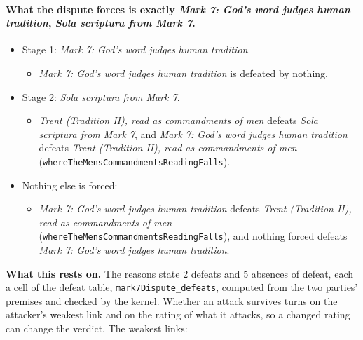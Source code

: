 \documentclass[11pt]{article}
\begin{document}
\paragraph{What the dispute forces is exactly \emph{Mark 7: God’s word judges human tradition}, \emph{Sola scriptura from Mark 7}.}
\begin{itemize}
\item Stage 1: \emph{Mark 7: God’s word judges human tradition}.
\begin{itemize}
\item \emph{Mark 7: God’s word judges human tradition} is defeated by nothing.
\end{itemize}
\item Stage 2: \emph{Sola scriptura from Mark 7}.
\begin{itemize}
\item \emph{Trent (Tradition II), read as commandments of men} defeats \emph{Sola scriptura from Mark 7}, and \emph{Mark 7: God’s word judges human tradition} defeats \emph{Trent (Tradition II), read as commandments of men} (\texttt{where\allowbreak{}The\allowbreak{}Mens\allowbreak{}Commandments\allowbreak{}Reading\allowbreak{}Falls}).
\end{itemize}
\item Nothing else is forced:
\begin{itemize}
\item \emph{Mark 7: God’s word judges human tradition} defeats \emph{Trent (Tradition II), read as commandments of men} (\texttt{where\allowbreak{}The\allowbreak{}Mens\allowbreak{}Commandments\allowbreak{}Reading\allowbreak{}Falls}), and nothing forced defeats \emph{Mark 7: God’s word judges human tradition}.
\end{itemize}
\end{itemize}
\par\noindent\textbf{What this rests on.} The reasons state 2 defeats and 5 absences of defeat, each a cell of the defeat table, \texttt{mark7\allowbreak{}Dispute\_\allowbreak{}defeats}, computed from the two parties' premises and checked by the kernel. Whether an attack survives turns on the attacker's weakest link and on the rating of what it attacks, so a changed rating can change the verdict. The weakest links:
\end{document}

